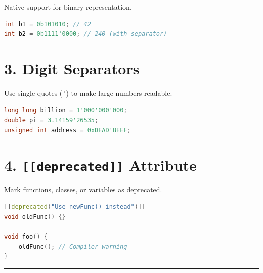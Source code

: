 Native support for binary representation.

\begin{lstlisting}[language={C++}]
int b1 = 0b101010; // 42
int b2 = 0b1111'0000; // 240 (with separator)
\end{lstlisting}

\hypertarget{digit-separators}{%
\section{3. Digit Separators}\label{digit-separators}}

Use single quotes (\passthrough{\lstinline!'!}) to make large numbers
readable.

\begin{lstlisting}[language={C++}]
long long billion = 1'000'000'000;
double pi = 3.14159'26535;
unsigned int address = 0xDEAD'BEEF;
\end{lstlisting}

\hypertarget{deprecated-attribute}{%
\section{\texorpdfstring{4. \texttt{{[}{[}deprecated{]}{]}}
Attribute}{4. {[}{[}deprecated{]}{]} Attribute}}\label{deprecated-attribute}}

Mark functions, classes, or variables as deprecated.

\begin{lstlisting}[language={C++}]
[[deprecated("Use newFunc() instead")]]
void oldFunc() {}

void foo() {
    oldFunc(); // Compiler warning
}
\end{lstlisting}

\begin{center}\rule{0.5\linewidth}{0.5pt}\end{center}
